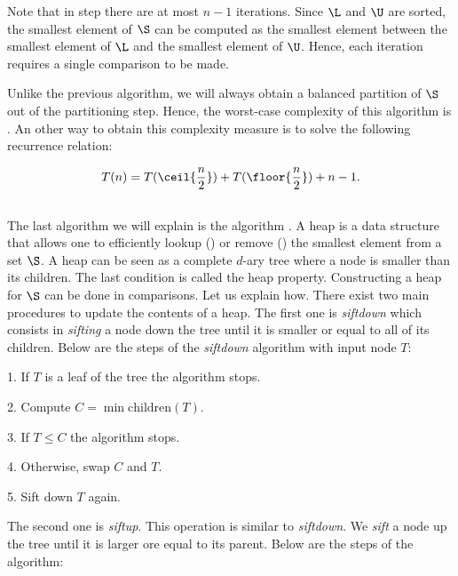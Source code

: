 Note that in step  there are at most \(n - 1\) iterations. Since \(\L\)
and \(\U\) are sorted, the smallest element of \(\S\) can be computed as the
smallest element between the smallest element of \(\L\) and the smallest
element of \(\U\). Hence, each iteration requires a single comparison to be
made.

Unlike the previous algorithm, we will always obtain a balanced partition of
\(\S\) out of the partitioning step. Hence, the worst-case complexity of this
algorithm is . An other way to obtain this complexity measure
is to solve the following recurrence relation:

\begin{displaymath}
T(n) = T(\ceil{\frac{n}{2}}) + T(\floor{\frac{n}{2}}) + n - 1.
\end{displaymath}

\subsection*{\heapsort}

The last algorithm we will explain is the \heapsort algorithm
\cite{williams:1964}. A heap is a data structure that allows one to
efficiently lookup () or remove () the smallest element
from a set \(\S\). A heap can be seen as a complete \(d\)-ary tree where a node
is smaller than its children. The last condition is called the heap property.
Constructing a heap for \(\S\) can be done in  comparisons.  Let us
explain how. There exist two main procedures to update the contents of a heap.
The first one is \emph{siftdown} which consists in \emph{sifting} a node down
the tree until it is smaller or equal to all of its children. Below are the
steps of the \emph{siftdown} algorithm with input node \(T\):

\begin{algorithm}
\item[1.] If \(T\) is a leaf of the tree the algorithm stops.
\item[2.] Compute \(C = \min \text{children}(T)\).
\item[3.] If \(T \le C\) the algorithm stops.
\item[4.] Otherwise, swap \(C\) and \(T\).
\item[5.] Sift down \(T\) again.
\end{algorithm}

The second one is \emph{siftup}. This operation is similar to \emph{siftdown}.
We \emph{sift} a node up the tree until it is larger ore equal to its parent.
Below are the steps of the algorithm:

